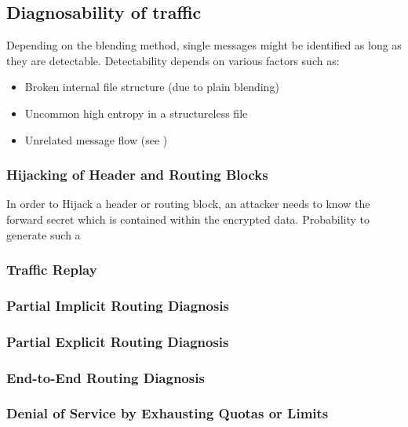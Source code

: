 \subsection{Diagnosability of traffic}
Depending on the blending method, single messages might be identified as long as they are detectable. Detectability depends on various factors such as:

\begin{itemize}
	\item Broken internal file structure (due to plain blending)
	\item Uncommon high entropy in a structureless file
	\item Unrelated message flow (see \cite{oakland2013-parrot})
\end{itemize}

\subsubsection{Hijacking of Header and Routing Blocks}
In order to Hijack a header or routing block, an attacker needs to know the forward secret which is contained within the encrypted data. Probability to generate such a

\subsubsection{Traffic Replay}

\subsubsection{Partial Implicit Routing Diagnosis}

\subsubsection{Partial Explicit Routing Diagnosis}

\subsubsection{End-to-End Routing Diagnosis}

\subsubsection{Denial of Service by Exhausting Quotas or Limits}

